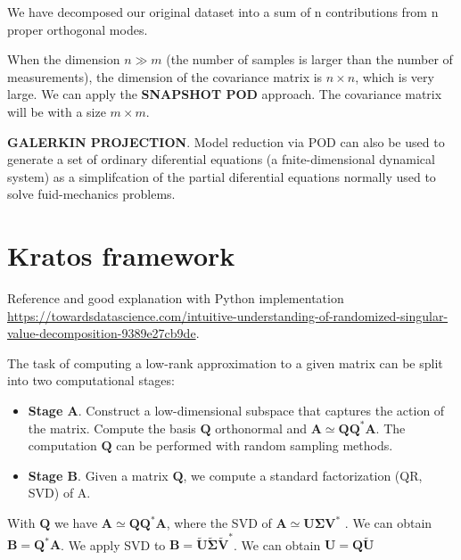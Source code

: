 \documentclass{article}
\begin{document}
We have decomposed our original dataset into a sum of n contributions from n proper 
orthogonal modes.\newline

When the dimension $n \gg m$ (the number of samples is larger than the number of measurements), the dimension of the covariance matrix is $n \times n$, which is very large. We can apply the \textbf{SNAPSHOT POD} approach. The  covariance matrix will be with a size $m \times m$. \newline

\textbf{GALERKIN PROJECTION}. Model reduction via POD can also be used to generate a set of ordinary diferential equations (a fnite-dimensional dynamical system) as a simplifcation of the partial diferential equations normally used to solve fuid-mechanics problems.

\section{Kratos framework}
Reference \cite{halko10} and good explanation with Python implementation \url{https://towardsdatascience.com/intuitive-understanding-of-randomized-singular-value-decomposition-9389e27cb9de}.\newline

The task of computing a low-rank approximation to a given matrix can be split into two computational stages:

\begin{itemize}
  \item \textbf{Stage A}. Construct a low-dimensional subspace that captures the action of the matrix. Compute the basis $\bm{Q}$ orthonormal and $\bm{A} \simeq \bm{Q}\bm{Q}^*\bm{A}$. The computation $\bm{Q}$ can be performed with random sampling methods. 
  \item \textbf{Stage B}. Given a matrix $\bm{Q}$, we compute a standard factorization (QR, SVD) of A.
\end{itemize}

With $\bm{Q}$ we have $\bm{A} \simeq \bm{Q}\bm{Q}^*\bm{A}$, where the SVD of  $\bm{A} \simeq \bm{U}\bm{\Sigma}\bm{V}^*$ . We can obtain $\bm{B} = \bm{Q}^*\bm{A}$. We apply SVD to $\bm{B} = \bm{\tilde{U}} \bm{\tilde {\Sigma}} \bm{\tilde{V}}^*$. We can obtain $\bm{U} = \bm{Q}\bm{\tilde{U}}$





\end{document}
